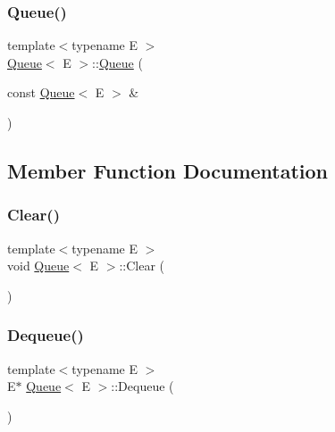 \mbox{\label{classQueue_ac071ee553005a67737d35edeeaafca5b}} 
\subsubsection{\texorpdfstring{Queue()}{Queue()}\hspace{0.1cm}{\footnotesize\ttfamily [2/2]}}
{\footnotesize\ttfamily template$<$typename E $>$ \\
\hyperlink{classQueue}{Queue}$<$ E $>$\+::\hyperlink{classQueue}{Queue} (\begin{DoxyParamCaption}\item[{const \hyperlink{classQueue}{Queue}$<$ E $>$ \&}]{ }\end{DoxyParamCaption})\hspace{0.3cm}{\ttfamily [private]}}



\subsection{Member Function Documentation}
\mbox{\label{classQueue_acfdd5f9f7e936ca30dcf877370ef9510}} 
\subsubsection{\texorpdfstring{Clear()}{Clear()}}
{\footnotesize\ttfamily template$<$typename E $>$ \\
void \hyperlink{classQueue}{Queue}$<$ E $>$\+::Clear (\begin{DoxyParamCaption}{ }\end{DoxyParamCaption})\hspace{0.3cm}{\ttfamily [inline]}}

\mbox{\label{classQueue_a434d465001c3078e999f7a89a8af84c0}} 
\subsubsection{\texorpdfstring{Dequeue()}{Dequeue()}}
{\footnotesize\ttfamily template$<$typename E $>$ \\
E$\ast$ \hyperlink{classQueue}{Queue}$<$ E $>$\+::Dequeue (\begin{DoxyParamCaption}{ }\end{DoxyParamCaption})\hspace{0.3cm}{\ttfamily [inline]}}

